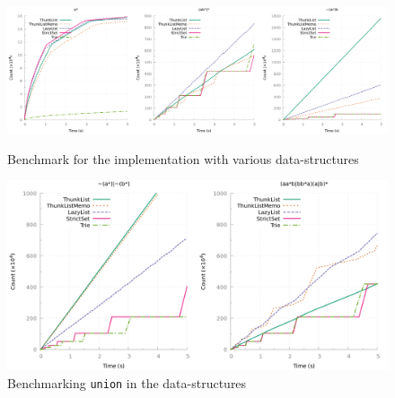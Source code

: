 \begin{figure}[b]
  \centering
  \includegraphics[height=0.33\linewidth]{measure/ocaml_all.png}
  \caption{Benchmark for the \ocaml implementation with various data-structures}
  \label{bench:ocaml:all}
  \includegraphics[height=0.33\linewidth]{measure/ocaml_union.png}
  \caption{Benchmarking \texttt{union} in the \ocaml data-structures}
  \label{bench:ocaml:union}
\end{figure}

